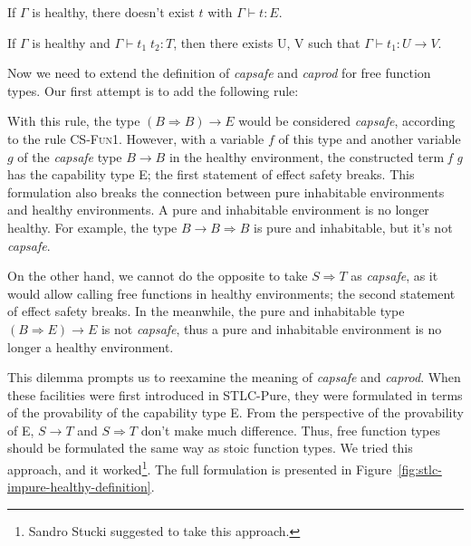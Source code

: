 \begin{definition}
  If $\Gamma$ is healthy, there doesn't exist $t$ with
  $\Gamma \vdash t : E$.
\end{definition}

\begin{definition}
  If $\Gamma$ is healthy and $\Gamma \vdash t_1 \; t_2 : T$, then
  there exists U, V such that $\Gamma \vdash t_1 : U \to V$.
\end{definition}

Now we need to extend the definition of \emph{capsafe} and
\emph{caprod} for free function types. Our first attempt is to add
the following rule:


With this rule, the type $(B \Rightarrow B) \to E$ would be considered
\emph{capsafe}, according to the rule \textsc{CS-Fun1}. However, with
a variable $f$ of this type and another variable $g$ of the
\emph{capsafe} type $B \to B$ in the healthy environment, the
constructed term \emph{f g} has the capability type E; the first
statement of effect safety breaks. This formulation also breaks the
connection between pure inhabitable environments and healthy
environments. A pure and inhabitable environment is no longer
healthy. For example, the type $B \to B \Rightarrow B$ is pure and
inhabitable, but it's not \emph{capsafe}.

On the other hand, we cannot do the opposite to take $S \Rightarrow T$
as \emph{capsafe}, as it would allow calling free functions in healthy
environments; the second statement of effect safety breaks. In the
meanwhile, the pure and inhabitable type $(B \Rightarrow E) \to E$ is
not \emph{capsafe}, thus a pure and inhabitable environment is no
longer a healthy environment.

This dilemma prompts us to reexamine the meaning of \emph{capsafe} and
\emph{caprod}. When these facilities were first introduced in
STLC-Pure, they were formulated in terms of the provability of the
capability type E. From the perspective of the provability of E,
$S \to T$ and $S \Rightarrow T$ don't make much difference. Thus, free
function types should be formulated the same way as stoic function
types. We tried this approach, and it worked\footnote{Sandro Stucki
  suggested to take this approach.}. The full formulation is presented
in Figure~\ref{fig:stlc-impure-healthy-definition}.


